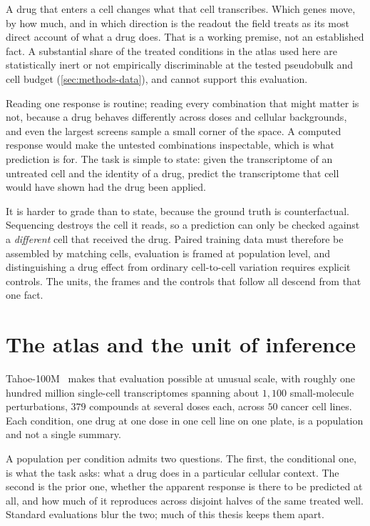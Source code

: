 A drug that enters a cell changes what that cell transcribes. Which genes move,
by how much, and in which direction is the readout the field treats as its most
direct account of what a drug does. That is a working premise, not an
established fact. A substantial share of the treated conditions in the atlas
used here are statistically inert or not empirically discriminable at the tested
pseudobulk and cell budget (\cref{sec:methods-data}), and cannot support this
evaluation.

Reading one response is routine; reading every combination that might matter is
not, because a drug behaves differently across doses and cellular backgrounds,
and even the largest screens sample a small corner of the space. A computed
response would make the untested combinations inspectable, which is what
prediction is for. The task is simple to state: given the transcriptome of an
untreated cell and the identity of a drug, predict the transcriptome that cell
would have shown had the drug been applied.

It is harder to grade than to state, because the ground truth is
counterfactual. Sequencing destroys the cell it reads, so a prediction can only
be checked against a \emph{different} cell that received the drug. Paired
training data must therefore be assembled by matching cells, evaluation is
framed at population level, and distinguishing a drug effect from ordinary
cell-to-cell variation requires explicit controls. The units, the frames and
the controls that follow all descend from that one fact.

\section{The atlas and the unit of inference}
\label{sec:intro-atlas}

Tahoe-100M~\cite{tahoe100m} makes that evaluation possible at unusual scale,
with roughly one hundred million single-cell transcriptomes spanning about $1{,}100$ small-molecule perturbations, $379$ compounds at several doses each, across $50$ cancer cell lines. Each condition, one
drug at one dose in one cell line on one plate, is a population and not a
single summary.

A population per condition admits two questions. The first, the conditional one, is what the task asks: what a drug does in a particular cellular context. The second is the prior one, whether the apparent response is there to be predicted at all, and how much
of it reproduces across disjoint halves of the same treated well. Standard
evaluations blur the two; much of this thesis keeps them apart.


